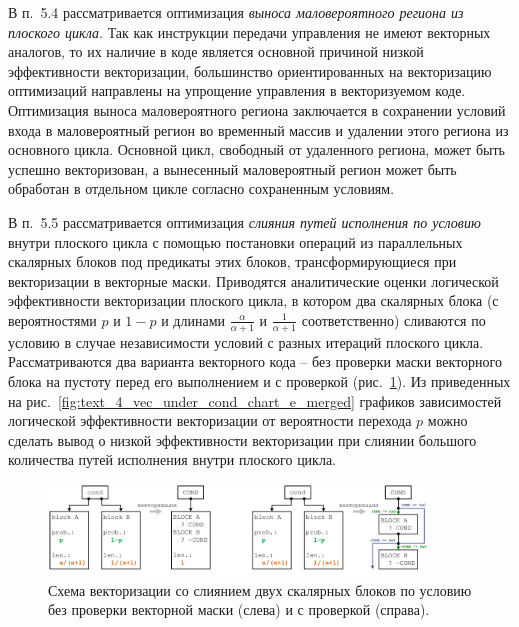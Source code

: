 \documentclass[a4paper,14pt]{extarticle}                     %
\theoremstyle{plain}                                         %
\begin{document}

В п.~5.4 рассматривается оптимизация \textit{выноса маловероятного региона из плоского цикла}.
Так как инструкции передачи управления не имеют векторных аналогов, то их наличие в коде является основной причиной низкой эффективности векторизации, большинство ориентированных на векторизацию оптимизаций направлены на упрощение управления в векторизуемом коде. 
Оптимизация выноса маловероятного региона заключается в сохранении условий входа в маловероятный регион во временный массив и удалении этого региона из основного цикла.
Основной цикл, свободный от удаленного региона, может быть успешно векторизован, а вынесенный маловероятный регион может быть обработан в отдельном цикле согласно сохраненным условиям.


В п.~5.5 рассматривается оптимизация \textit{слияния путей исполнения по условию} внутри плоского цикла с помощью постановки операций из параллельных скалярных блоков под предикаты этих блоков, трансформирующиеся при векторизации в векторные маски.
Приводятся аналитические оценки логической эффективности векторизации плоского цикла, в котором два скалярных блока (с вероятностями $p$ и $1 - p$ и длинами $\frac{\alpha}{\alpha + 1}$ и $\frac{1}{\alpha + 1}$ соответственно) сливаются по условию в случае независимости условий с разных итераций плоского цикла.
Рассматриваются два варианта векторного кода -- без проверки маски векторного блока на пустоту перед его выполнением и с проверкой (рис.~\ref{fig:vec_ifconv_nocheck_check}).
Из приведенных на рис.~\ref{fig:text_4_vec_under_cond_chart_e_merged} графиков зависимостей логической эффективности векторизации от вероятности перехода $p$ можно сделать вывод о низкой эффективности векторизации при слиянии большого количества путей исполнения внутри плоского цикла.

\begin{figure}[!ht]
\centering
\includegraphics[width=0.9\textwidth]{./fig/vec_ifconv_nocheck_check.pdf}
\singlespacing
\caption{Схема векторизации со слиянием двух скалярных блоков по условию без проверки векторной маски (слева) и с проверкой (справа).}
\label{fig:vec_ifconv_nocheck_check}
\end{figure}
\end{document}
